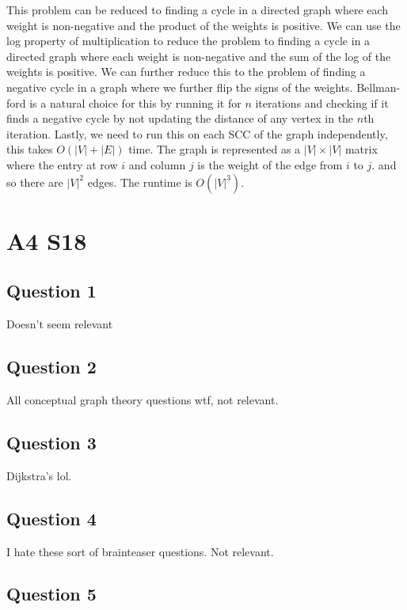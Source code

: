 \documentclass[11pt]{article}
\begin{document}
This problem can be reduced to finding a cycle in a directed graph where each weight is non-negative and the product of the weights is positive. We can use the log property of multiplication to reduce the problem to finding a cycle in a directed graph where each weight is non-negative and the sum of the log of the weights is positive. We can further reduce this to the problem of finding a negative cycle in a graph where we further flip the signs of the weights. Bellman-ford is a natural choice for this by running it for $n$ iterations and checking if it finds a negative cycle by not updating the distance of any vertex in the $n$th iteration. Lastly, we need to run this on each SCC of the graph independently, this takes $O(|V| + |E|)$ time. The graph is represented as a $|V| \times |V|$ matrix where the entry at row $i$ and column $j$ is the weight of the edge from $i$ to $j$. and so there are $|V|^2$ edges. The runtime is $O(|V|^3)$.

\section{A4 S18}

\subsection{Question 1}

Doesn't seem relevant

\subsection{Question 2}

All conceptual graph theory questions wtf, not relevant.

\subsection{Question 3}

Dijkstra's lol.

\subsection{Question 4}

I hate these sort of brainteaser questions. Not relevant.

\subsection{Question 5}
\end{document}
